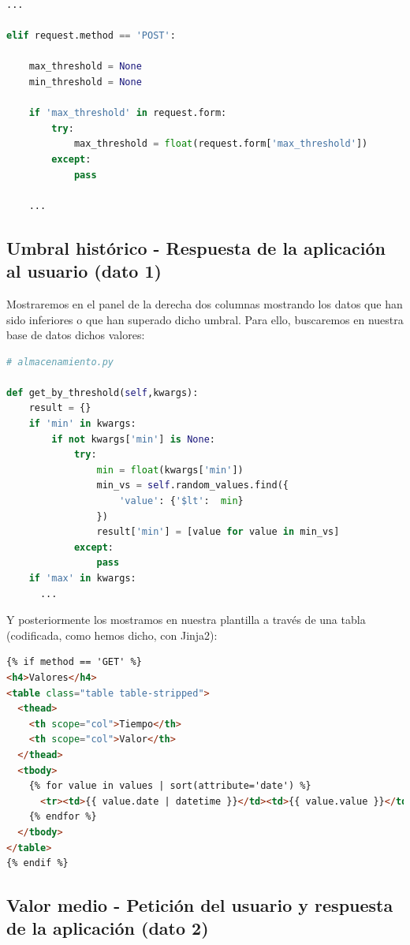 \documentclass{article}
\begin{document}
\begin{lstlisting}[language=python]
    ...

elif request.method == 'POST':

    max_threshold = None
    min_threshold = None

    if 'max_threshold' in request.form:
        try:
            max_threshold = float(request.form['max_threshold'])
        except:
            pass

    ...

\end{lstlisting}


\subsection{Umbral histórico - Respuesta de la aplicación al usuario (dato 1)}

Mostraremos en el panel de la derecha dos columnas mostrando los datos que han sido inferiores o que han superado dicho umbral. Para ello, buscaremos en nuestra base de datos dichos valores:

\begin{lstlisting}[language=python]
# almacenamiento.py

def get_by_threshold(self,kwargs):
    result = {}
    if 'min' in kwargs:
        if not kwargs['min'] is None:
            try:
                min = float(kwargs['min'])
                min_vs = self.random_values.find({
                    'value': {'$lt':  min}
                })
                result['min'] = [value for value in min_vs]
            except:
                pass
    if 'max' in kwargs:
      ...

\end{lstlisting}


Y posteriormente los mostramos en nuestra plantilla a través de una tabla (codificada, como hemos dicho, con Jinja2):

\begin{lstlisting}[language=html]
{% if method == 'GET' %}
<h4>Valores</h4>
<table class="table table-stripped">
  <thead>
    <th scope="col">Tiempo</th>
    <th scope="col">Valor</th>
  </thead>
  <tbody>
    {% for value in values | sort(attribute='date') %}
      <tr><td>{{ value.date | datetime }}</td><td>{{ value.value }}</td></tr>
    {% endfor %}
  </tbody>
</table>
{% endif %}

\end{lstlisting}

\subsection{Valor medio - Petición del usuario y respuesta de la aplicación (dato 2)}
\end{document}
